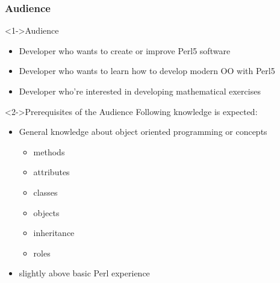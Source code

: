 \documentclass[ngerman,xcolor={table,dvipsnames},scriptsizeer,compress,hyperref={bookmarks,colorlinks}]{beamer}
\begin{document}
\begin{frame}[fragile]
\frametitle{Audience}
\begin{block}<1->{Audience}
\begin{itemize}
\item Developer who wants to create or improve Perl5 software
\item Developer who wants to learn how to develop modern OO with Perl5
\item Developer who're interested in developing mathematical exercises
\end{itemize}
\end{block}

\begin{block}<2->{Prerequisites of the Audience}
Following knowledge is expected:
\begin{itemize}
\item General knowledge about object oriented programming or concepts
      \begin{itemize}
      \item methods
      \item attributes
      \item classes
      \item objects
      \item inheritance
      \item roles
      \end{itemize}
\item slightly above basic Perl experience
\end{itemize}
\end{block}
\end{frame}
\end{document}
